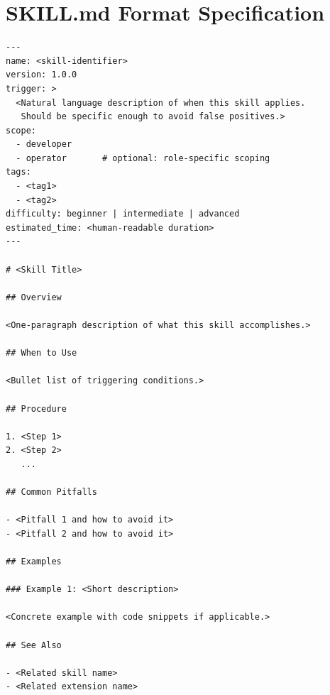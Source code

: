 \documentclass[11pt]{article}
\begin{document}
\section{SKILL.md Format Specification}
\label{app:skill-format}

\begin{verbatim}
---
name: <skill-identifier>
version: 1.0.0
trigger: >
  <Natural language description of when this skill applies.
   Should be specific enough to avoid false positives.>
scope:
  - developer
  - operator       # optional: role-specific scoping
tags:
  - <tag1>
  - <tag2>
difficulty: beginner | intermediate | advanced
estimated_time: <human-readable duration>
---

# <Skill Title>

## Overview

<One-paragraph description of what this skill accomplishes.>

## When to Use

<Bullet list of triggering conditions.>

## Procedure

1. <Step 1>
2. <Step 2>
   ...

## Common Pitfalls

- <Pitfall 1 and how to avoid it>
- <Pitfall 2 and how to avoid it>

## Examples

### Example 1: <Short description>

<Concrete example with code snippets if applicable.>

## See Also

- <Related skill name>
- <Related extension name>
\end{verbatim}
\end{document}
